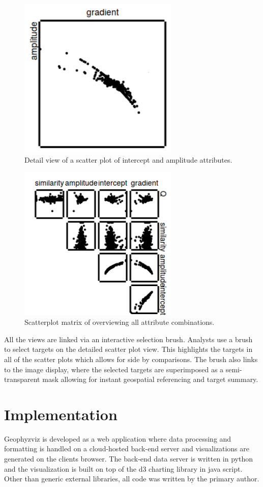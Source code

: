 \documentclass[journal]{vgtc}                %
\begin{document}
\begin{figure}[htb]
\centering
\includegraphics[width=3in]{crossplot}
\caption{Detail view of a scatter plot of intercept and amplitude attributes.}
\end{figure}

\begin{figure}[htb]
\centering
\includegraphics[width=3in]{scatterplot_matrix}
\caption{Scatterplot matrix of overviewing all attribute combinations.}
\end{figure}

All the views are linked via an interactive selection brush. Analysts use a brush to
select targets on the detailed scatter plot view. This highlights the targets in all of
the scatter plots which allows for side by comparisons. The brush also links to the image display,
where the selected targets are superimposed as a semi-transparent mask allowing for instant
geospatial referencing and target summary.

\section{Implementation}
Geophyzviz is developed as a web application where data processing and formatting
is handled on a cloud-hosted back-end server and visualizations are generated
on the clients browser. The back-end data server is written in python and the visualization
is built on top of the d3 charting library in java script. Other than generic external libraries,
all code was written by the primary author.
\end{document}
